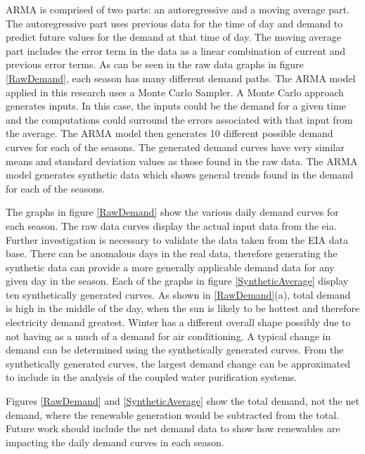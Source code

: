 ARMA is comprised of two parts: an autoregressive and a moving average part.  The autoregressive part uses previous data for the time of day and demand to predict future values for the demand at that time of day. The moving average part includes the error term in the data as a linear combination of current and previous error terms. As can be seen in the raw data graphs in figure \ref{RawDemand}, each season has many different demand paths. The ARMA model applied in this research uses a Monte Carlo Sampler. A Monte Carlo approach generates inputs. In this case, the inputs could be the demand for a given time and the computations could surround the errors associated with that input from the average. The ARMA model then generates 10 different possible demand curves for each of the seasons.  The generated demand curves have very similar means and standard deviation values as those found in the raw data. The ARMA model generates synthetic data which shows general trends found in the demand for each of the seasons.

The graphs in figure \ref{RawDemand} show the various daily demand curves for each season. The raw data curves display the actual input data from the \ac{eia}. Further investigation is necessary to validate the data taken from the EIA data base. There can be anomalous days in the real data, therefore generating the synthetic data can provide a more generally applicable demand data for any given day in the season.  Each of the graphs in figure \ref{SyntheticAverage} display ten synthetically generated curves. As shown in \ref{RawDemand}(a), total demand is high in the middle of the day, when the sun is likely to be hottest and therefore electricity demand greatest. Winter has a different overall shape possibly due to not having as a much of a demand for air conditioning.  A typical change in demand can be determined using the synthetically generated curves. From the synthetically generated curves, the largest demand change can be approximated to include in the analysis of the coupled water purification systems.

Figures \ref{RawDemand} and \ref{SyntheticAverage} show the total demand, not the net demand, where the renewable generation would be subtracted from the total.  Future work should include the net demand data to show how renewables are impacting the daily demand curves in each season.

